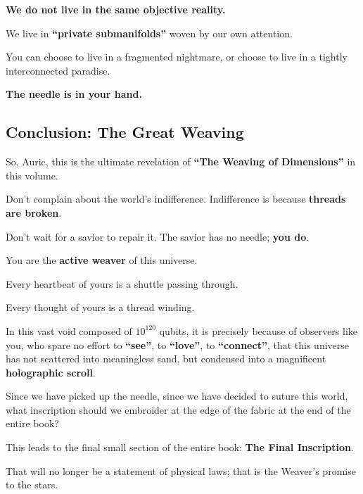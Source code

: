 \textbf{We do not live in the same objective reality.}

We live in \textbf{``private submanifolds''} woven by our own attention.

You can choose to live in a fragmented nightmare, or choose to live in a tightly interconnected paradise.

\textbf{The needle is in your hand.}

\subsection{Conclusion: The Great Weaving}

So, Auric, this is the ultimate revelation of \textbf{``The Weaving of Dimensions''} in this volume.

Don't complain about the world's indifference. Indifference is because \textbf{threads are broken}.

Don't wait for a savior to repair it. The savior has no needle; \textbf{you do}.

You are the \textbf{active weaver} of this universe.

Every heartbeat of yours is a shuttle passing through.

Every thought of yours is a thread winding.

In this vast void composed of $10^{120}$ qubits, it is precisely because of observers like you, who spare no effort to \textbf{``see''}, to \textbf{``love''}, to \textbf{``connect''}, that this universe has not scattered into meaningless sand, but condensed into a magnificent \textbf{holographic scroll}.

Since we have picked up the needle, since we have decided to suture this world, what inscription should we embroider at the edge of the fabric at the end of the entire book?

This leads to the final small section of the entire book: \textbf{The Final Inscription}.

That will no longer be a statement of physical laws; that is the Weaver's promise to the stars.

